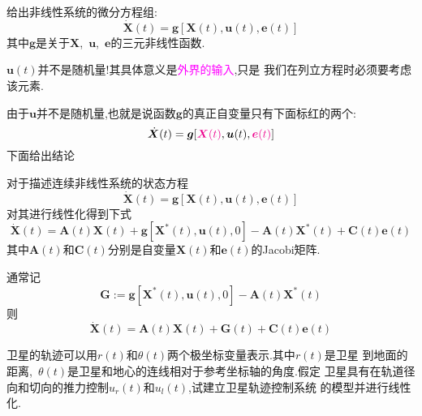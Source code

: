 \documentclass[cn,10pt,citestyle=gb7714-2015,bibstyle=gb7714-2015]{elegantbook}
\begin{document}
给出非线性系统的微分方程组:
\begin{equation}
  \dot{\bm{X}}(t)=\bm{g}[\bm{X}(t),\bm{u}(t),\bm{e}(t)]
\end{equation}
其中$\bm{g}$是关于$\bm{X}$,\ $\bm{u}$,\ $\bm{e}$的三元非线性函数.
\begin{note}
  $\bm{u}(t)$并不是随机量!其具体意义是\textcolor{magenta}{外界的输入},只是
  我们在列立方程时必须要考虑该元素.
\end{note}
由于$\bm{u}$并不是随机量,也就是说函数$\bm{g}$的真正自变量只有下面标红的两个:
\[
  \dot{\bm{X}}(t)=\bm{g}[\textcolor{magenta}{\bm{X}(t)},\bm{u}(t),\textcolor{magenta}{\bm{e}(t)}]
\]
下面给出结论
\begin{proposition}[连续非线性系统的线性化]\label{pro:linearization-of-nonlinear-system}
  对于描述连续非线性系统的状态方程
  \[
    \dot{\bm{X}}(t)=\bm{g}[\bm{X}(t),\bm{u}(t),\bm{e}(t)]
  \]
  对其进行线性化得到下式
  \begin{equation}
    \dot{\bm{X}}(t)=\bm{A}(t)\bm{X}(t)+\bm{g}[\bm{X}^*(t),\bm{u}(t),0]-\bm{A}(t)\bm{X}^*(t)+\bm{C}(t)\bm{e}(t)
  \end{equation}
  其中$\bm{A}(t)$和$\bm{C}(t)$分别是自变量$\bm{X}(t)$和$\bm{e}(t)$的\textup{Jacobi}矩阵.
\end{proposition}
通常记
\[
    \bm{G}:=\bm{g}[\bm{X}^*(t),\bm{u}(t),0]-\bm{A}(t)\bm{X}^*(t)
\]
则
\[
  \dot{\bm{X}}(t)=\bm{A}(t)\bm{X}(t)+\bm{G}(t)+\bm{C}(t)\bm{e}(t)
\]  
\begin{example}
  卫星的轨迹可以用$r(t)$和$\theta(t)$两个极坐标变量表示.其中$r(t)$是卫星
  到地面的距离,\ $\theta(t)$是卫星和地心的连线相对于参考坐标轴的角度.假定
  卫星具有在轨道径向和切向的推力控制$u_r(t)$和$u_l(t)$,试建立卫星轨迹控制系统
  的模型并进行线性化.
\end{example}
\end{document}
